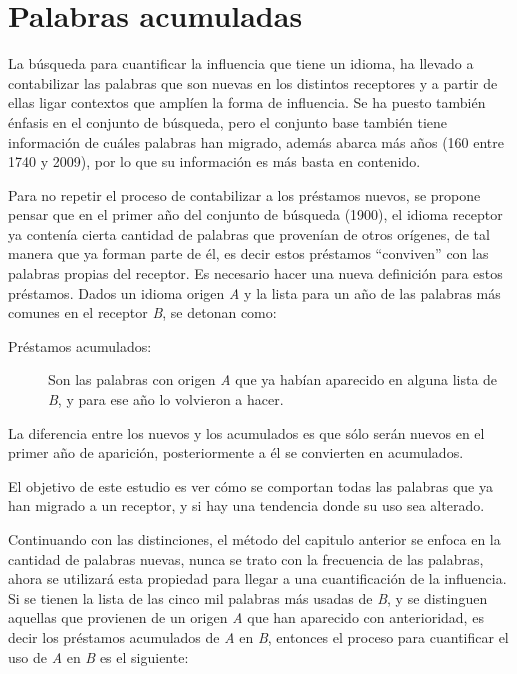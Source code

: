 \chapter{Palabras acumuladas}

La búsqueda para cuantificar la influencia que tiene un idioma, ha llevado a contabilizar las palabras que son nuevas en los distintos receptores y a partir de ellas ligar contextos que amplíen la forma de influencia.  Se ha puesto también énfasis en el conjunto de búsqueda, pero  el conjunto base  también tiene información de cuáles palabras han migrado, además  abarca más años (160 entre 1740 y 2009), por lo que su información es más basta en contenido. 

Para no repetir el proceso de contabilizar a los préstamos nuevos,  se propone pensar que en el primer año del conjunto de búsqueda (1900),  el idioma receptor ya contenía cierta cantidad de palabras que provenían de otros orígenes,  de tal manera que ya forman parte de él, es decir estos préstamos “conviven” con las palabras propias del receptor. Es necesario hacer una nueva definición para estos préstamos.   Dados un idioma  origen  \textit{A} y  la lista para un año  de las palabras más comunes en el receptor \textit{B},  se detonan como: 

\begin{description}
	\item[Préstamos acumulados:] Son las palabras con origen \textit{A} que ya habían aparecido en alguna lista de \textit{B}, y para ese año lo volvieron a hacer.  
\end{description}

La diferencia entre los nuevos y los acumulados es que sólo serán nuevos en el primer año de aparición,  posteriormente a él se convierten en acumulados. 


El objetivo de este estudio es ver cómo se comportan todas las palabras que ya han migrado a un receptor, y si hay una tendencia donde su uso sea alterado. 

Continuando con las distinciones, el método del capitulo anterior se enfoca en la cantidad de palabras nuevas, nunca se trato con la frecuencia de las palabras, ahora se utilizará esta propiedad  para llegar a una cuantificación de la influencia. Si se tienen la lista de las cinco mil palabras más usadas  de \textit{B}, y se distinguen aquellas que provienen de un origen \textit{A} que han aparecido con anterioridad, es decir los préstamos acumulados de \textit{A} en \textit{B}, entonces el proceso para cuantificar el uso de \textit{A} en \textit{B} es el siguiente: 

